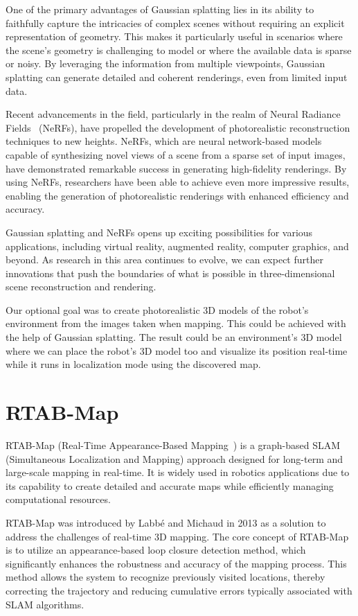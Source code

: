 One of the primary advantages of Gaussian splatting lies in its ability to faithfully capture the intricacies of complex scenes without requiring an explicit representation of geometry. This makes it particularly useful in scenarios where the scene's geometry is challenging to model or where the available data is sparse or noisy. By leveraging the information from multiple viewpoints, Gaussian splatting can generate detailed and coherent renderings, even from limited input data.

Recent advancements in the field, particularly in the realm of Neural Radiance Fields~\cite{nerf} (NeRFs), have propelled the development of photorealistic reconstruction techniques to new heights. NeRFs, which are neural network-based models capable of synthesizing novel views of a scene from a sparse set of input images, have demonstrated remarkable success in generating high-fidelity renderings. By using NeRFs, researchers have been able to achieve even more impressive results, enabling the generation of photorealistic renderings with enhanced efficiency and accuracy.

Gaussian splatting and NeRFs opens up exciting possibilities for various applications, including virtual reality, augmented reality, computer graphics, and beyond. As research in this area continues to evolve, we can expect further innovations that push the boundaries of what is possible in three-dimensional scene reconstruction and rendering.

Our optional goal was to create photorealistic 3D models of the robot's environment from the images taken when mapping. This could be achieved with the help of Gaussian splatting. The result could be an environment's 3D model where we can place the robot's 3D model too and visualize its position real-time while it runs in localization mode using the discovered map.

\section{RTAB-Map}

RTAB-Map (Real-Time Appearance-Based Mapping~\cite{RTAB_Map_docs}) is a graph-based SLAM (Simultaneous Localization and Mapping) approach designed for long-term and large-scale mapping in real-time. It is widely used in robotics applications due to its capability to create detailed and accurate maps while efficiently managing computational resources.

RTAB-Map was introduced by Labbé and Michaud in 2013 as a solution to address the challenges of real-time 3D mapping. The core concept of RTAB-Map is to utilize an appearance-based loop closure detection method, which significantly enhances the robustness and accuracy of the mapping process. This method allows the system to recognize previously visited locations, thereby correcting the trajectory and reducing cumulative errors typically associated with SLAM algorithms.

